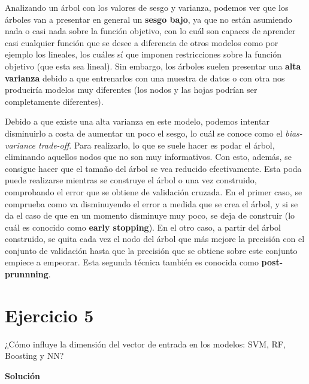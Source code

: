 \documentclass[11pt,a4paper]{article}
\newcommand{\answer}{\noindent\textbf{Solución}}
\newcommand{\addtoc}[1]{\addcontentsline{toc}{section}{#1}}
\begin{document}
Analizando un árbol con los valores de sesgo y varianza, podemos ver que los árboles van a presentar en general un \textbf{sesgo
bajo}, ya que no están asumiendo nada o casi nada sobre la función objetivo, con lo cuál son capaces de aprender casi cualquier
función que se desee a diferencia de otros modelos como por ejemplo los lineales, los cuáles sí que imponen restricciones sobre la
función objetivo (que esta sea lineal). Sin embargo, los árboles suelen presentar una \textbf{alta varianza} debido a que entrenarlos
con una muestra de datos o con otra nos produciría modelos muy diferentes (los nodos y las hojas podrían ser completamente
diferentes).

Debido a que existe una alta varianza en este modelo, podemos intentar disminuirlo a costa de aumentar un poco el sesgo, lo cuál se
conoce como el \textit{bias-variance trade-off}. Para realizarlo, lo que se suele hacer es podar el árbol, eliminando aquellos nodos
que no son muy informativos. Con esto, además, se consigue hacer que el tamaño del árbol se vea reducido efectivamente. Esta poda
puede realizarse mientras se construye el árbol o una vez construido, comprobando el error que se obtiene de validación cruzada. En
el primer caso, se comprueba como va disminuyendo el error a medida que se crea el árbol, y si se da el caso de que en un momento
disminuye muy poco, se deja de construir (lo cuál es conocido como \textbf{early stopping}). En el otro caso, a partir del árbol
construido, se quita cada vez el nodo del árbol que más mejore la precisión con el conjunto de validación hasta que la precisión
que se obtiene sobre este conjunto empiece a empeorar. Esta segunda técnica también es conocida como \textbf{post-prunnning}.

\section*{Ejercicio 5}
\addtoc{Ejercicio 5}

\noindent ¿Cómo influye la dimensión del vector de entrada en los modelos: SVM, RF, Boosting y
NN?

\answer
\end{document}
